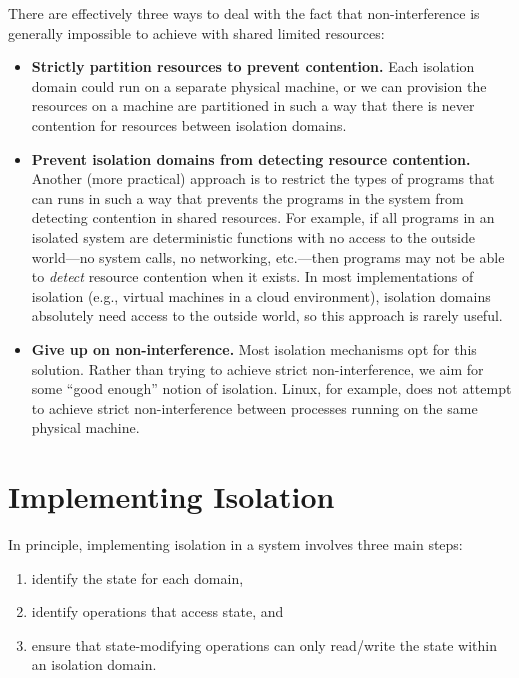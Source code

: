 There are effectively three ways to deal with the fact
that non-interference is generally impossible to 
achieve with shared limited resources:
\begin{itemize}
\item \textbf{Strictly partition resources to prevent contention.}
      Each isolation domain could run on a separate physical machine,
      or we can provision the resources on a machine are partitioned
      in such a way that there is never contention for resources
      between isolation domains.

\item \textbf{Prevent isolation domains from detecting resource contention.}
      Another (more practical) approach is to restrict the types
      of programs that can runs in such a way that prevents
      the programs in the system from detecting contention in 
      shared resources.
      For example, if all programs in an isolated system are deterministic
      functions with no access to the outside world---no system calls,
      no networking, etc.---then programs may not be able to \emph{detect}
      resource contention when it exists.
      In most implementations of isolation (e.g., virtual machines in
      a cloud environment), isolation domains absolutely need access to the
      outside world, so this approach is rarely useful.

\item \textbf{Give up on non-interference.}
      Most isolation mechanisms opt for this solution.
      Rather than trying to achieve strict non-interference,
      we aim for some ``good enough'' notion of isolation.
      Linux, for example, does not attempt to achieve
      strict non-interference between processes running
      on the same physical machine.

\end{itemize}

\section{Implementing Isolation}
In principle, implementing isolation in a system involves three main steps:
\begin{enumerate}
	\item identify the state for each domain,
	\item identify operations that access state, and
	\item ensure that state-modifying operations 
        can only read/write the state within
        an isolation domain.
\end{enumerate}


